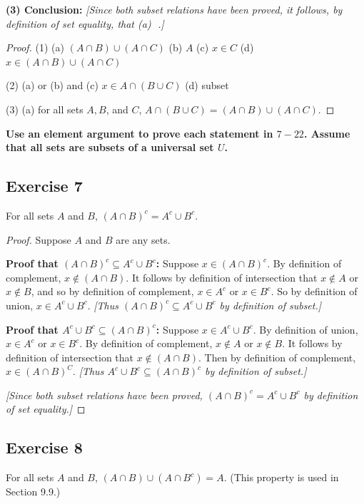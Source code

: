 \documentclass[14pt]{extarticle}
\newcommand{\fbl}{\underline{\hspace{1cm}}\,\,}
\newcommand{\cy}{\color{cyan}}
\begin{document}
{\bf (3) Conclusion:} {\it [Since both subset relations have been proved, it follows, by definition of set equality, that {\cy (a) \fbl}.]}

\begin{proof}
(1) (a) \((A \cap B) \cup (A \cap C)\) (b) $A$ (c) \(x \in C\) (d) \(x \in (A \cap B) \cup (A \cap C)\)

(2) (a) or (b) and (c) \(x \in A \cap (B \cup C)\) (d) subset

(3) (a) for all sets $A, B$, and $C$, \(A \cap (B \cup C) = (A \cap B) \cup (A \cap C)\).
\end{proof}

{\bf \cy Use an element argument to prove each statement in $7-22$. Assume that all sets are subsets of a universal set $U$.}

\subsection{Exercise 7}
For all sets $A$ and $B$, \((A \cap B)^c = A^c \cup B^c\).

\begin{proof}
Suppose $A$ and $B$ are any sets.

{\bf Proof that \((A \cap B)^c \subseteq A^c \cup B^c\):} Suppose \(x \in (A \cap B)^c\). By definition of 
complement, \(x \notin (A \cap B)\). It follows by definition of intersection that \(x \notin A\) or 
\(x \notin B\), and so by definition of complement, \(x \in A^c \) or \(x \in B^c\). So by definition of union, 
\(x \in A^c \cup B^c\). {\it [Thus \((A \cap B)^c \subseteq A^c \cup B^c\) by definition of subset.]}

{\bf Proof that \(A^c \cup B^c \subseteq (A \cap B)^c\):} Suppose \(x \in A^c \cup B^c\). By definition of union, 
\(x \in A^c\) or \(x \in B^c\). By definition of complement, \(x \notin A\) or \(x \notin B\). It follows by 
definition of intersection that \(x \notin (A \cap B)\). Then by definition of complement, \(x \in (A \cap B)^C\).
{\it [Thus \(A^c \cup B^c \subseteq (A \cap B)^c\) by definition of subset.]}

{\it [Since both subset relations have been proved, \((A \cap B)^c = A^c \cup B^c\) by definition of set equality.]}
\end{proof}

\subsection{Exercise 8}
For all sets $A$ and $B$, \((A \cap B) \cup (A \cap B^c) = A\). (This property is used in Section 9.9.)
\end{document}
